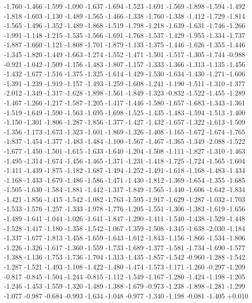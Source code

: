 \documentclass[9pt]{article}
\theoremstyle{plain}
\theoremstyle{definition}
\theoremstyle{remark}
\numberwithin{equation}{section}
\begin{document}
-1.760
-1.466
-1.599
-1.090
-1.637
-1.694
-1.523
-1.691
-1.569
-1.898
-1.594
-1.492
-1.818
-1.603
-1.130
-1.489
-1.565
-1.466
-1.338
-1.760
-1.338
-1.412
-1.729
-1.814
-1.565
-1.496
-1.352
-1.489
-1.868
-1.519
-1.798
-1.218
-1.639
-1.631
-1.746
-1.266
-1.991
-1.148
-1.215
-1.535
-1.566
-1.691
-1.768
-1.537
-1.429
-1.955
-1.334
-1.737
-1.887
-1.660
-1.121
-1.808
-1.701
-1.879
-1.133
-1.375
-1.446
-1.626
-1.355
-1.446
-1.345
-1.820
-1.449
-1.663
-1.274
-1.552
-1.471
-1.501
-1.517
-1.305
-1.744
-0.988
-0.921
-1.042
-1.509
-1.156
-1.483
-1.807
-1.157
-1.333
-1.366
-1.313
-1.135
-1.456
-1.432
-1.677
-1.516
-1.375
-1.325
-1.614
-1.429
-1.530
-1.634
-1.430
-1.271
-1.606
-1.391
-1.239
-1.919
-1.157
-1.493
-1.259
-1.608
-1.241
-1.190
-1.511
-1.310
-1.377
-2.012
-1.349
-1.317
-1.628
-1.898
-1.561
-1.849
-1.323
-0.832
-1.522
-1.455
-1.289
-1.467
-1.266
-1.217
-1.587
-1.205
-1.417
-1.446
-1.580
-1.657
-1.683
-1.343
-1.361
-1.519
-1.649
-1.590
-1.563
-1.695
-1.698
-1.525
-1.435
-1.483
-1.594
-1.513
-1.400
-1.150
-1.301
-1.806
-1.287
-1.856
-1.377
-1.427
-1.432
-1.657
-1.322
-1.613
-1.509
-1.356
-1.173
-1.673
-1.323
-1.601
-1.869
-1.326
-1.408
-1.165
-1.672
-1.674
-1.765
-1.837
-1.454
-1.377
-1.483
-1.484
-1.100
-1.567
-1.467
-1.365
-1.349
-2.088
-1.522
-1.677
-1.450
-1.501
-1.615
-1.633
-1.640
-1.204
-1.508
-1.111
-1.827
-1.310
-1.463
-1.495
-1.314
-1.674
-1.456
-1.465
-1.371
-1.231
-1.418
-1.725
-1.724
-1.565
-1.604
-1.411
-1.439
-1.875
-1.182
-1.687
-1.494
-1.252
-1.491
-1.618
-1.168
-1.483
-1.434
-1.168
-1.433
-1.679
-1.486
-1.586
-1.471
-1.430
-1.812
-1.369
-1.654
-1.355
-1.685
-1.505
-1.630
-1.584
-1.881
-1.442
-1.317
-1.849
-1.565
-1.440
-1.606
-1.642
-1.834
-1.421
-1.856
-1.415
-1.542
-1.082
-1.763
-1.595
-1.917
-1.629
-1.287
-1.032
-1.703
-1.533
-1.576
-1.257
-1.333
-1.978
-1.776
-1.205
-1.551
-1.306
-1.383
-1.619
-1.656
-1.489
-1.641
-1.044
-1.026
-1.641
-1.847
-1.290
-1.411
-1.540
-1.438
-1.529
-1.448
-1.528
-1.417
-1.180
-1.358
-1.542
-1.067
-1.359
-1.508
-1.345
-1.638
-2.030
-1.184
-1.337
-1.677
-1.813
-1.458
-1.659
-1.643
-1.612
-1.843
-1.156
-1.866
-1.534
-1.806
-1.226
-1.326
-1.617
-1.360
-1.559
-1.733
-1.689
-1.377
-1.581
-1.734
-1.690
-1.577
-1.388
-1.136
-1.753
-1.736
-1.704
-1.313
-1.435
-1.857
-1.542
-0.960
-1.288
-1.542
-1.287
-1.521
-1.493
-1.108
-1.422
-1.480
-1.474
-1.573
-1.171
-1.260
-0.297
-1.209
-0.817
-0.845
-1.504
-1.244
-0.815
-1.112
-1.549
-1.167
-1.280
-1.424
-1.198
-1.205
-1.246
-1.453
-1.559
-1.320
-1.489
-1.388
-1.679
-0.973
-1.238
-1.898
-1.281
-1.299
-1.077
-0.987
-0.684
-0.993
-1.634
-1.048
-0.977
-1.340
-1.198
-0.081
-1.405
+0.010
\end{document}
